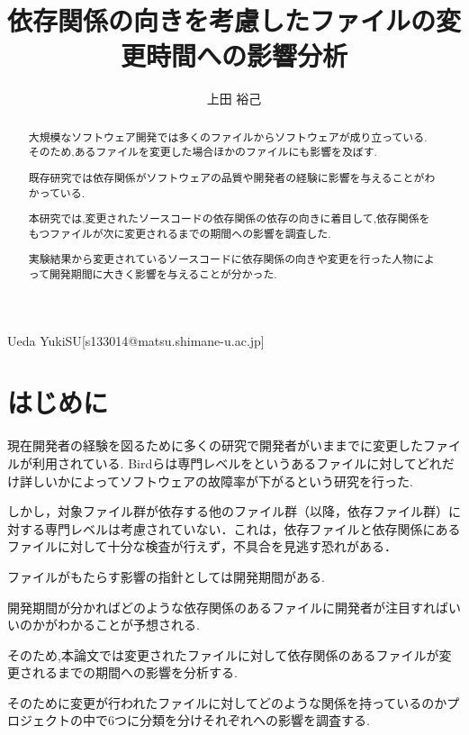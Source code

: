 \documentclass[submit,ses,noauthor]{ipsj} %
\begin{document}
\title{依存関係の向きを考慮したファイルの変更時間への影響分析}

\etitle{}



\author{上田 裕己}{Ueda Yuki}{SU}[s133014@matsu.shimane-u.ac.jp]

\begin{abstract}
大規模なソフトウェア開発では多くのファイルからソフトウェアが成り立っている.
そのため,あるファイルを変更した場合ほかのファイルにも影響を及ぼす.

既存研究では依存関係がソフトウェアの品質や開発者の経験に影響を与えることがわかっている.

本研究では,変更されたソースコードの依存関係の依存の向きに着目して,依存関係をもつファイルが次に変更されるまでの期間への影響を調査した.
 
実験結果から変更されているソースコードに依存関係の向きや変更を行った人物によって開発期間に大きく影響を与えることが分かった.
  

\end{abstract}

\maketitle

\section{はじめに} 
現在開発者の経験を図るために多くの研究で開発者がいままでに変更したファイルが利用されている.
Bird\cite{Bird}らは専門レベルをというあるファイルに対してどれだけ詳しいかによってソフトウェアの故障率が下がるという研究を行った.


しかし，対象ファイル群が依存する他のファイル群（以降，依存ファイル群）に対する専門レベルは考慮されていない．これは，依存ファイルと依存関係にあるファイルに対して十分な検査が行えず，不具合を見逃す恐れがある．

ファイルがもたらす影響の指針としては開発期間がある.


開発期間が分かればどのような依存関係のあるファイルに開発者が注目すればいいのかがわかることが予想される.


そのため,本論文では変更されたファイルに対して依存関係のあるファイルが変更されるまでの期間への影響を分析する.

そのために変更が行われたファイルに対してどのような関係を持っているのかプロジェクトの中で6つに分類を分けそれぞれへの影響を調査する.
\end{document}
